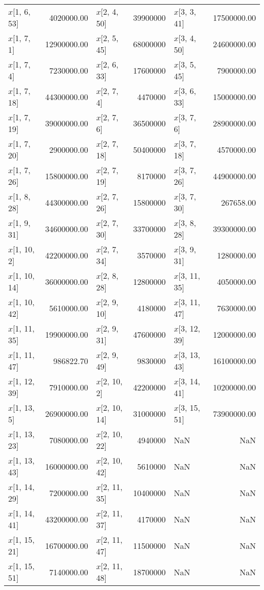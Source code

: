\begin{longtable}{lrlrlr}
$x$[1, 6, 53] & 4020000.00 & $x$[2, 4, 50] & 39900000 & $x$[3, 3, 41] & 17500000.00 \\
$x$[1, 7, 1] & 12900000.00 & $x$[2, 5, 45] & 68000000 & $x$[3, 4, 50] & 24600000.00 \\
$x$[1, 7, 4] & 7230000.00 & $x$[2, 6, 33] & 17600000 & $x$[3, 5, 45] & 7900000.00 \\
$x$[1, 7, 18] & 44300000.00 & $x$[2, 7, 4] & 4470000 & $x$[3, 6, 33] & 15000000.00 \\
$x$[1, 7, 19] & 39000000.00 & $x$[2, 7, 6] & 36500000 & $x$[3, 7, 6] & 28900000.00 \\
$x$[1, 7, 20] & 2900000.00 & $x$[2, 7, 18] & 50400000 & $x$[3, 7, 18] & 4570000.00 \\
$x$[1, 7, 26] & 15800000.00 & $x$[2, 7, 19] & 8170000 & $x$[3, 7, 26] & 44900000.00 \\
$x$[1, 8, 28] & 44300000.00 & $x$[2, 7, 26] & 15800000 & $x$[3, 7, 30] & 267658.00 \\
$x$[1, 9, 31] & 34600000.00 & $x$[2, 7, 30] & 33700000 & $x$[3, 8, 28] & 39300000.00 \\
$x$[1, 10, 2] & 42200000.00 & $x$[2, 7, 34] & 3570000 & $x$[3, 9, 31] & 1280000.00 \\
$x$[1, 10, 14] & 36000000.00 & $x$[2, 8, 28] & 12800000 & $x$[3, 11, 35] & 4050000.00 \\
$x$[1, 10, 42] & 5610000.00 & $x$[2, 9, 10] & 4180000 & $x$[3, 11, 47] & 7630000.00 \\
$x$[1, 11, 35] & 19900000.00 & $x$[2, 9, 31] & 47600000 & $x$[3, 12, 39] & 12000000.00 \\
$x$[1, 11, 47] & 986822.70 & $x$[2, 9, 49] & 9830000 & $x$[3, 13, 43] & 16100000.00 \\
$x$[1, 12, 39] & 7910000.00 & $x$[2, 10, 2] & 42200000 & $x$[3, 14, 41] & 10200000.00 \\
$x$[1, 13, 5] & 26900000.00 & $x$[2, 10, 14] & 31000000 & $x$[3, 15, 51] & 73900000.00 \\
$x$[1, 13, 23] & 7080000.00 & $x$[2, 10, 22] & 4940000 & NaN & NaN \\
$x$[1, 13, 43] & 16000000.00 & $x$[2, 10, 42] & 5610000 & NaN & NaN \\
$x$[1, 14, 29] & 7200000.00 & $x$[2, 11, 35] & 10400000 & NaN & NaN \\
$x$[1, 14, 41] & 43200000.00 & $x$[2, 11, 37] & 4170000 & NaN & NaN \\
$x$[1, 15, 21] & 16700000.00 & $x$[2, 11, 47] & 11500000 & NaN & NaN \\
$x$[1, 15, 51] & 7140000.00 & $x$[2, 11, 48] & 18700000 & NaN & NaN \\

\end{longtable}
